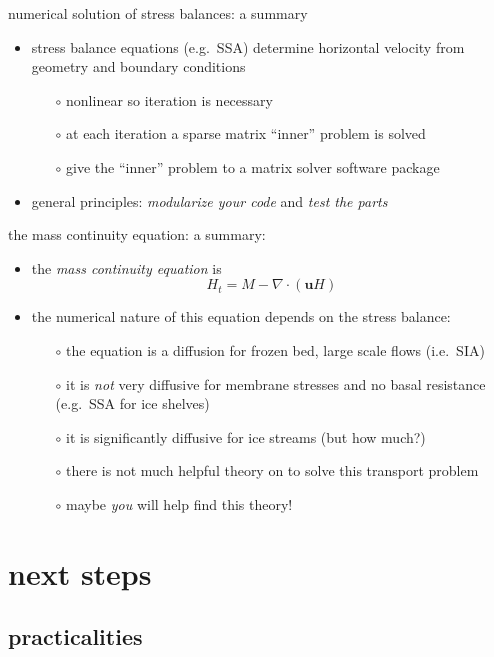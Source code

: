 \documentclass[titlepage,letterpaper,final,12pt]{scrartcl}
\begin{document}
numerical solution of stress balances: a summary

\begin{itemize}
\item stress balance equations (e.g.~SSA) determine horizontal velocity from geometry and boundary conditions
  \begin{itemize}
  \item[$\circ$] nonlinear so iteration is necessary
  \item[$\circ$] at each iteration a sparse matrix ``inner'' problem is solved
  \item[$\circ$] give the ``inner'' problem to a matrix solver software package
  \end{itemize}
\item general principles: \emph{modularize your code} and \emph{test the parts}
\end{itemize}

the mass continuity equation: a summary:

\begin{itemize}
\item the \emph{mass continuity equation} is
  $$H_t = M - \nabla \cdot (\mathbf{u} H)$$
\item the numerical nature of this equation depends on the stress balance:
  \begin{itemize}
  \item[$\circ$] the equation is a diffusion for frozen bed, large scale flows (i.e.~SIA)
  \item[$\circ$] it is \emph{not} very diffusive for membrane stresses and no basal resistance (e.g.~SSA for ice shelves)
  \item[$\circ$] it is significantly diffusive for ice streams (but how much?)
  \item[$\circ$] there is not much helpful theory on to solve this transport problem
  \item[$\circ$] maybe \emph{you} will help find this theory!
  \end{itemize}
\end{itemize}


\section{next steps}

\subsection{practicalities}
\end{document}
